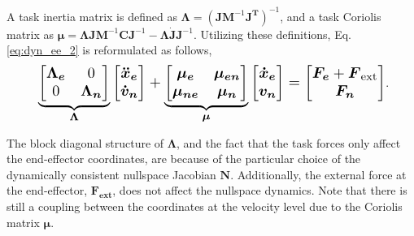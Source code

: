 \documentclass[../main.tex]{subfiles}
\begin{document}
A task inertia matrix is defined as $\bm{\Lambda} = (\bm{J} \bm{M}^{-1}\bm{J^{T}})^{-1}$, and a task Coriolis matrix as $\bm{\mu}= \bm{\Lambda} \bm{J} \bm{M}^{-1}\bm{C}\bm{J}^{-1}-\bm{\Lambda} \dot{\bm{J}} \bm{J}^{-1} $. Utilizing these definitions, Eq. \eqref{eq:dyn_ee_2} is reformulated as follows,
\begin{equation}
    \label{eq:dyn_decop}
    \resizebox{0.9\hsize}{!}{
    $
    \underbrace{\begin{bmatrix}
        \bm{\Lambda_e} & 0 \\
        0 & \bm{\Lambda_n}
    \end{bmatrix}}_{ \bm{\Lambda}}
    \begin{bmatrix}
        \bm{\Ddot{x}_e} \\
        \bm{\dot{v}_n}
    \end{bmatrix} +
    \underbrace{\begin{bmatrix}
        \bm{\mu_e} & \bm{\mu_{en}} \\
        \bm{\mu_{ne}} & \bm{\mu_{n}}
    \end{bmatrix}}_{\bm{\mu}}
    \begin{bmatrix}
        \bm{\dot{x}_e} \\
        \bm{{v_n}}
    \end{bmatrix} = \begin{bmatrix}
        \bm{F_e} + \bm{{F}}_{\rm ext}\\
        \bm{F_n}
    \end{bmatrix}$}.
\end{equation} \par
The block diagonal structure of $\bm{\Lambda}$, and the fact that the task forces only affect the end-effector coordinates, are because of the particular choice of the dynamically consistent nullspace Jacobian $\bm{N}$. Additionally, the external force at the end-effector,  $\bm{F_{ext}}$, does not affect the nullspace dynamics. Note that there is still a coupling between the coordinates at the velocity level due to the Coriolis matrix $\bm{\mu}$.
\end{document}
